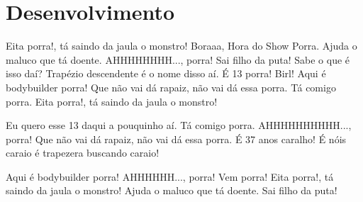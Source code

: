 \section{Desenvolvimento}

   Eita porra!, tá saindo da jaula o monstro! Boraaa, Hora do Show Porra. Ajuda o maluco que tá doente. AHHHHHHHH..., porra! Sai filho da puta! Sabe o que é isso daí? Trapézio descendente é o nome disso aí. É 13 porra! Birl! Aqui é bodybuilder porra! Que não vai dá rapaiz, não vai dá essa porra. Tá comigo porra. Eita porra!, tá saindo da jaula o monstro!
    
    Eu quero esse 13 daqui a pouquinho aí. Tá comigo porra. AHHHHHHHHHH..., porra! Que não vai dá rapaiz, não vai dá essa porra. É 37 anos caralho! É nóis caraio é trapezera buscando caraio!
    
    Aqui é bodybuilder porra! AHHHHHH..., porra! Vem porra! Eita porra!, tá saindo da jaula o monstro! Ajuda o maluco que tá doente. Sai filho da puta!